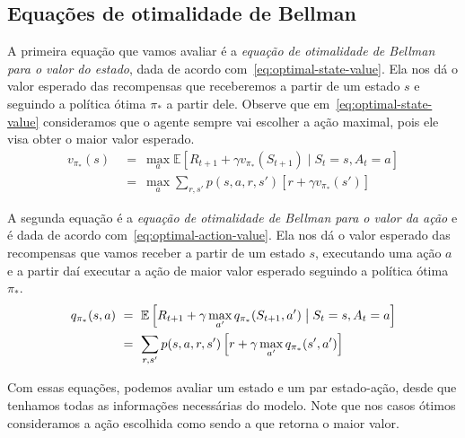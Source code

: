 \documentclass{article}
\begin{document}
        \subsection{Equações de otimalidade de Bellman}

            A primeira equação que vamos avaliar é a \emph{equação de otimalidade de Bellman para o valor do estado}, dada de acordo com~\eqref{eq:optimal-state-value}. Ela nos dá o valor esperado das recompensas que receberemos a partir de um estado $s$ e seguindo a política ótima $\pi_*$ a partir dele. Observe que em~\eqref{eq:optimal-state-value} consideramos que o agente sempre vai escolher a ação maximal, pois ele visa obter o maior valor esperado.
            \begin{equation}
                \begin{aligned}
                    v_{\pi_*}(s) 
                    & \ = \ \max_a \mathbb{E} \left[ R_{t+1} + \gamma v_{\pi_*}(S_{t+1}) \mid S_t = s, A_t = a \right] \\
                    & \ = \ \max_a \sum_{r, s'} p(s, a, r, s') \left[ r + \gamma v_{\pi_*}(s') \right]
                \end{aligned}
                \label{eq:optimal-state-value}
            \end{equation}
            
            A segunda equação é a \emph{equação de otimalidade de Bellman para o valor da ação} e é dada de acordo com~\eqref{eq:optimal-action-value}. Ela nos dá o valor esperado das recompensas que vamos receber a partir de um estado $s$, executando uma ação $a$ e a partir daí executar a ação de maior valor esperado seguindo a política ótima $\pi_*$.
            \begin{equation}
                \begin{aligned}
                    q_{\pi_*}(s,a) 
                    & \ = \ \mathbb{E} \left[ R_{t+1} + \gamma \max_{a'} q_{\pi_*}(S_{t+1}, a') \bigm\vert S_t = s, A_t = a \right] \\
                    & \ = \ \sum_{r, s'} p(s, a, r, s') \left[ r + \gamma \max_{a'}q_{\pi_*}(s', a') \right]
                \end{aligned}
                \label{eq:optimal-action-value}
            \end{equation}

            Com essas equações, podemos avaliar um estado e um par estado-ação, desde que tenhamos todas as informações necessárias do modelo. Note que nos casos ótimos consideramos a ação escolhida como sendo a que retorna o maior valor. 
            
\end{document}
